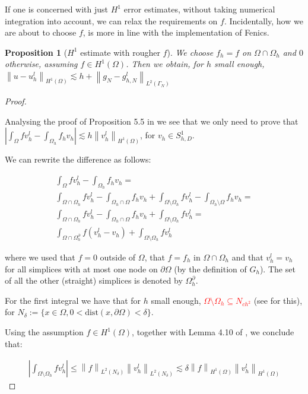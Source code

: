 \documentclass[english,a4paper,10pt,oneside]{scrbook}	%
\theoremstyle{break}
\newtheorem{prop}[equation]{Proposition}
\newenvironment{mproof}[1][\proofname]{%
  \begin{proof}[#1]$ $\par\nobreak\ignorespaces
}{%
  \end{proof}
}
\renewcommand*{\proofname}{Proof}
\theoremstyle{remark}
\newcommand{\ds}{\displaystyle}
\newcommand{\norm}[1]{\left\lVert#1\right\rVert}
\begin{document}
If one is concerned with just $H^1$ error estimates, without taking numerical integration into account, we can relax the requirements on $f$. Incidentally, how we are about to choose $f$, is more in line with the implementation of Fenics.

\begin{prop}[$H^1$ estimate with rougher $f$]
We choose $f_h=f $ on $\Omega \cap \Omega_h$ and $0$ otherwise, assuming $f \in H^1(\Omega)$. Then we obtain, for $h$ small enough, $\norm{u-u_h^l}_{H^1(\Omega)} \lesssim h + \norm{g_N-g_{h,N}^l}_{L^2(\Gamma_N)}$
\end{prop}
\begin{mproof}

Analysing the proof of Proposition 5.5 in \cite{edelmann} we see that we only need to prove that $\ds \left | \int_\Omega f v_h^l - \int_{\Omega_h}f_h v_h \right |\lesssim h \norm{v_h^l}_{H^1(\Omega)} $, for $v_h \in S^1_{h,D}$.

We can rewrite the difference as follows:

\begin{align*}
\int_\Omega f v_h^l - \int_{\Omega_h}f_h v_h   =\\
\int_{\Omega \cap \Omega_h} f v_h^l - \int_{\Omega_h \cap \Omega} f_h v_h  + \int_{\Omega \setminus \Omega_h} f v_h^l - \int_{\Omega_h \setminus \Omega} f_h v_h  =\\
\int_{\Omega \cap \Omega_h} f v_h^l - \int_{\Omega_h \cap \Omega} f_h v_h  + \int_{\Omega \setminus \Omega_h} f v_h^l = \\
\int_{\Omega \cap \Omega_h^\partial} f (v_h^l - v_h)  + \int_{\Omega \setminus \Omega_h} f v_h^l
\end{align*}

where we used that $f=0$ outside of $\Omega$, that $f=f_h$ in $\Omega \cap \Omega_h$ and that $v_h^l=v_h$ for all simplices with at most one node on $\partial \Omega$ (by the definition of $G_h$). The set of all the other (straight) simplices is denoted by $\Omega_h^\partial$.

For the first integral we have that for $h$ small enough, \textcolor{red}{$\Omega \setminus \Omega_h \subseteq N_{ch^2}$} (see \cite{tiihonen} for this), for $N_\delta :=\{ x \in \Omega, 0 <\text{dist}(x,\partial \Omega) < \delta\}$.

Using the assumption $f 	\in H^1(\Omega)$, together with Lemma 4.10 of \cite{elliott}, we conclude that:

\begin{align*}
\left | \int_{\Omega \setminus \Omega_h} f v_h^l \right | \leq \norm{f}_{L^2(N_\delta)} \norm{v_h^l}_{L^2(N_\delta)} \lesssim \delta \norm{f}_{H^1(\Omega)} \norm{v_h^l}_{H^1(\Omega)}
\end{align*} 


\end{mproof}
\end{document}
